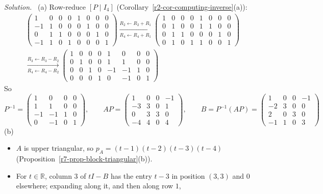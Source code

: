\documentclass[12pt]{article}
\newcommand{\R}{\mathbb R}
\theoremstyle{definition}
\newenvironment{solution}{\par\noindent\textit{Solution.}\ }{\par\smallskip}
\begin{document}
\begin{solution}
(a) Row-reduce \([P\mid I_4]\) (Corollary~\ref{r2-cor-computing-inverse}(a)):
\[
\begin{gathered}
\left(\begin{array}{cccc|cccc}1&0&0&0&1&0&0&0\\-1&1&0&0&0&1&0&0\\0&1&1&0&0&0&1&0\\-1&1&0&1&0&0&0&1\end{array}\right)
\xrightarrow[R_4\leftarrow R_4+R_1]{R_2\leftarrow R_2+R_1}
\left(\begin{array}{cccc|cccc}1&0&0&0&1&0&0&0\\0&1&0&0&1&1&0&0\\0&1&1&0&0&0&1&0\\0&1&0&1&1&0&0&1\end{array}\right)
\\
\xrightarrow[R_4\leftarrow R_4-R_2]{R_3\leftarrow R_3-R_2}
\left(\begin{array}{cccc|cccc}1&0&0&0&1&0&0&0\\0&1&0&0&1&1&0&0\\0&0&1&0&-1&-1&1&0\\0&0&0&1&0&-1&0&1\end{array}\right)
\end{gathered}
\]
So
\[
P^{-1}=\begin{pmatrix}1&0&0&0\\1&1&0&0\\-1&-1&1&0\\0&-1&0&1\end{pmatrix},\qquad
AP=\begin{pmatrix}1&0&0&-1\\-3&3&0&1\\0&3&3&0\\-4&4&0&4\end{pmatrix},\qquad
B=P^{-1}(AP)=\begin{pmatrix}1&0&0&-1\\-2&3&0&0\\2&0&3&0\\-1&1&0&3\end{pmatrix}
\]
(b)
\begin{itemize}
\item \(A\) is upper triangular, so \(p_A=(t-1)(t-2)(t-3)(t-4)\) (Proposition~\ref{r7-prop-block-triangular}(b)).
\item For \(t\in\R\), column \(3\) of \(tI-B\) has the entry \(t-3\) in position \((3,3)\) and \(0\) elsewhere; expanding
along it, and then along row \(1\),

\end{itemize}
\end{solution}
\end{document}
